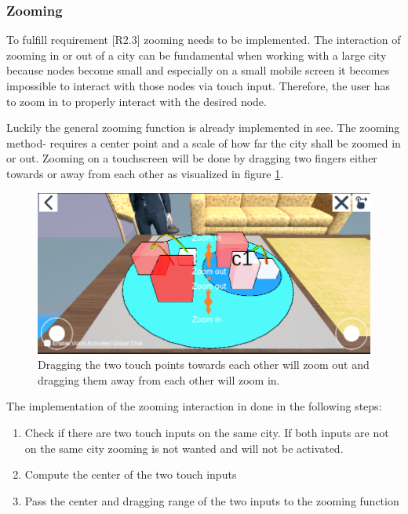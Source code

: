 \subsubsection{Zooming}
To fulfill requirement [R2.3] zooming needs to be implemented.
The interaction of zooming in or out of a \gls{city} can be fundamental when working with a large \gls{city} because \glspl{node} become small and especially on a small mobile screen it becomes impossible to interact with those nodes via touch input. 
Therefore, the user has to zoom in to properly interact with the desired node.

Luckily the general zooming function is already implemented in \gls{see}.
The zooming method- requires a center point and a scale of how far the \gls{city} shall be zoomed in or out.
Zooming on a touchscreen will be done by dragging two fingers either towards or away from each other as visualized in figure \ref{fig:zooming}.

\begin{figure}[htb]
    \centering
    \includegraphics[width=1\textwidth]{Implementation/img/zoom.png}
    \caption{Dragging the two touch points towards each other will zoom out and dragging them away from each other will zoom in.}\label{fig:zooming}
\end{figure}

The implementation of the zooming interaction in done in the following steps: 
\begin{enumerate}
    \item Check if there are two touch inputs on the same \gls{city}. If both inputs are not on the same city zooming is not wanted and will not be activated.
    \item Compute the center of the two touch inputs
    \item Pass the center and dragging range of the two inputs to the zooming function
\end{enumerate}

